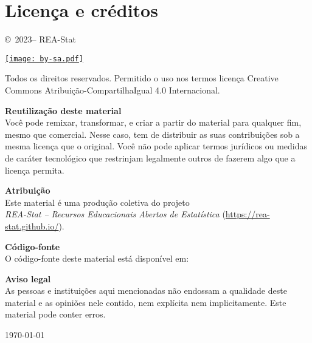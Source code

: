 \section{Licença e créditos}

\noindent
\copyright\
2023--{\the\year}
REA-Stat
\\

\vspace{1em}

\hfil
\href{https://creativecommons.org/licenses/by-sa/4.0/deed.pt-br}{\texttt{[image: by-sa.pdf]}}
\embedfile{figures/by-sa.pdf}

\vspace{1em}

\noindent
Todos os direitos reservados.
Permitido o uso nos termos licença Creative Commons Atribuição-CompartilhaIgual 4.0 Internacional.

\vspace{1em}

\textbf{Reutilização deste material}
\\
\noindent
Você pode remixar, transformar, e criar a partir do material para qualquer fim, mesmo que comercial.
Nesse caso, tem de distribuir as suas contribuições sob a mesma licença que o original.
Você não pode aplicar termos jurídicos ou medidas de caráter tecnológico que restrinjam legalmente outros de fazerem algo que a licença permita.

\vspace{1em}

\textbf{Atribuição}
\\
\noindent
Este material é uma produção coletiva do projeto
\\
\emph{REA-Stat -- Recursos Educacionais Abertos de Estatística}
(\url{https://rea-stat.github.io/}).

\vspace{1em}

\textbf{Código-fonte}
\\
\noindent
O código-fonte deste material está disponível em:
\mysourceurl


\vspace{1em}

\textbf{Aviso legal}
\\
\noindent
As pessoas e instituições aqui mencionadas não endossam a qualidade deste material e as opiniões nele contido, nem explícita nem implicitamente.
Este material pode conter erros.

\vspace{1em}

\hfill
\today

\vfill
\vfill

\thispagestyle{empty}

\clearpage
